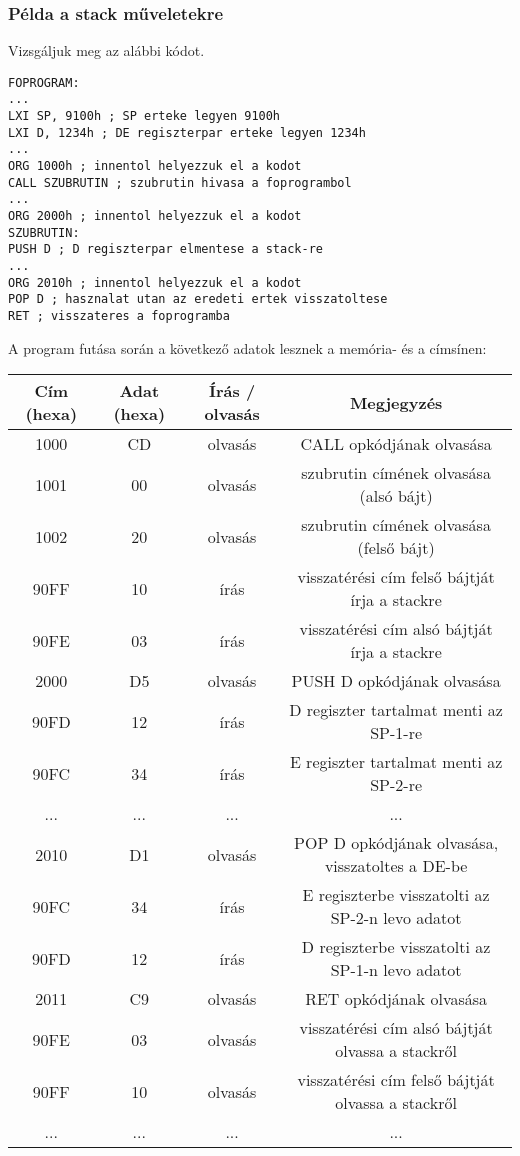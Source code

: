 \subsubsection{Példa a stack műveletekre}
Vizsgáljuk meg az alábbi kódot.
\begin{lstlisting}[frame=single]
FOPROGRAM:
...
LXI SP, 9100h ; SP erteke legyen 9100h
LXI D, 1234h ; DE regiszterpar erteke legyen 1234h
...
ORG 1000h ; innentol helyezzuk el a kodot
CALL SZUBRUTIN ; szubrutin hivasa a foprogrambol
...
ORG 2000h ; innentol helyezzuk el a kodot
SZUBRUTIN:
PUSH D ; D regiszterpar elmentese a stack-re
...
ORG 2010h ; innentol helyezzuk el a kodot
POP D ; hasznalat utan az eredeti ertek visszatoltese
RET ; visszateres a foprogramba
\end{lstlisting}
A program futása során a következő adatok lesznek a memória- és a címsínen:
\begin{center}
\begin{tabular}{ |c|c|c|c| }
 \hline
 Cím (hexa) & Adat (hexa) & Írás / olvasás & Megjegyzés \\ \hline
 1000 & CD & olvasás & CALL opkódjának olvasása \\ \hline
 1001 & 00 & olvasás & szubrutin címének olvasása (alsó bájt) \\ \hline
 1002 & 20 & olvasás & szubrutin címének olvasása (felső bájt) \\ \hline
 90FF & 10 & írás & visszatérési cím felső bájtját írja a stackre \\ \hline
 90FE & 03 & írás & visszatérési cím alsó bájtját írja a stackre \\ \hline
 2000 & D5 & olvasás & PUSH D opkódjának olvasása \\ \hline
 90FD & 12 & írás & D regiszter tartalmat menti az SP-1-re \\ \hline
 90FC & 34 & írás & E regiszter tartalmat menti az SP-2-re \\ \hline
 ... & ... & ... & ... \\ \hline
 2010 & D1 & olvasás & POP D opkódjának olvasása, visszatoltes a DE-be \\ \hline
 90FC & 34 & írás & E regiszterbe visszatolti az SP-2-n levo adatot \\ \hline
 90FD & 12 & írás & D regiszterbe visszatolti az SP-1-n levo adatot \\ \hline
 2011 & C9 & olvasás & RET opkódjának olvasása \\ \hline
 90FE & 03 & olvasás & visszatérési cím alsó bájtját olvassa a stackről \\ \hline
 90FF & 10 & olvasás & visszatérési cím felső bájtját olvassa a stackről \\ \hline
 ... & ... & ... & ... \\ \hline
\end{tabular}
\end{center}

